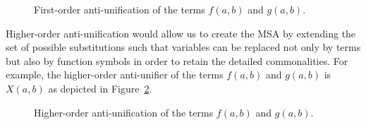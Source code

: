 \begin{figure}[t]
\centering{}
\caption{First-order anti-unification of the terms $f(a,b)$ and $g(a,b)$.\label{fig:first-anti-uni}}
\end{figure}

Higher-order anti-unification would allow us to create the MSA by extending the set of possible substitutions such that variables can be replaced not only by terms but also by function symbols in order to retain the detailed commonalities. For example, the higher-order anti-unifier of the terms $f(a,b)$ and $g(a,b)$ is $X(a,b)$ as depicted in Figure~\ref{fig:higher-anti-uni}.
\begin{figure}[t]
\centering{}
\caption{Higher-order anti-unification of the terms $f(a,b)$ and $g(a,b)$.\label{fig:higher-anti-uni}}
\end{figure}



